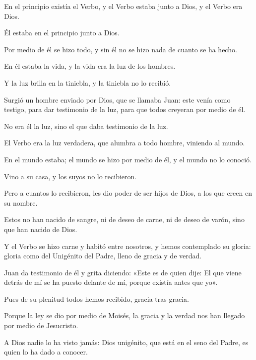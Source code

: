 \begin{scripture}
	En el principio existía el Verbo, y el Verbo estaba junto a Dios, y el Verbo era Dios.
	
	Él estaba en el principio junto a Dios.
	
	Por medio de él se hizo todo, y sin él no se hizo nada de cuanto se ha hecho.
	
	En él estaba la vida, y la vida era la luz de los hombres.
	
	Y la luz brilla en la tiniebla, y la tiniebla no lo recibió.
	
	Surgió un hombre enviado por Dios, que se llamaba Juan: este venía como testigo, para dar testimonio de la luz, para que todos creyeran por medio de él.
	
	No era él la luz, sino el que daba testimonio de la luz.
	
	El Verbo era la luz verdadera, que alumbra a todo hombre, viniendo al mundo.
	
	En el mundo estaba; el mundo se hizo por medio de él, y el mundo no lo conoció.
	
	Vino a su casa, y los suyos no lo recibieron.
	
	Pero a cuantos lo recibieron, les dio poder de ser hijos de Dios, a los que creen en su nombre.
	
	Estos no han nacido de sangre, ni de deseo de carne, ni de deseo de varón, sino que han nacido de Dios.
	
	Y el Verbo se hizo carne y habitó entre nosotros, y hemos contemplado su gloria: gloria como del Unigénito del Padre, lleno de gracia y de verdad.
	
	Juan da testimonio de él y grita diciendo: «Este es de quien dije: El que viene detrás de mí se ha puesto delante de mí, porque existía antes que yo».
	
	Pues de su plenitud todos hemos recibido, gracia tras gracia.
	
	Porque la ley se dio por medio de Moisés, la gracia y la verdad nos han llegado por medio de Jesucristo.
	
	A Dios nadie lo ha visto jamás: Dios unigénito, que está en el seno del Padre, es quien lo ha dado a conocer.
\end{scripture}



 


